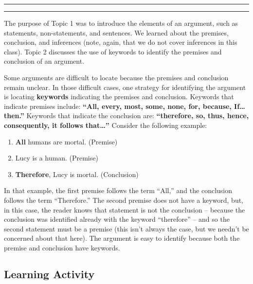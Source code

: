 \documentclass[
]{book}
\providecommand{\tightlist}{%
  \setlength{\itemsep}{0pt}\setlength{\parskip}{0pt}}
\begin{document}
\begin{center}\rule{0.5\linewidth}{0.5pt}\end{center}

\begin{center}\rule{0.5\linewidth}{0.5pt}\end{center}

The purpose of Topic 1 was to introduce the elements of an argument, such as statements, non-statements, and sentences. We learned about the premises, conclusion, and inferences (note, again, that we do not cover inferences in this class). Topic 2 discusses the use of keywords to identify the premises and conclusion of an argument.

Some arguments are difficult to locate because the premises and conclusion remain unclear. In those difficult cases, one strategy for identifying the argument is locating \textbf{keywords} indicating the premises and conclusion. Keywords that indicate premises include: \textbf{``All, every, most, some, none, for, because, If\ldots then.''} Keywords that indicate the conclusion are: \textbf{``therefore, so, thus, hence, consequently, it follows that\ldots{}''} Consider the following example:

\begin{enumerate}
\def\labelenumi{\arabic{enumi}.}
\tightlist
\item
  \textbf{All} humans are mortal. (Premise)
\item
  Lucy is a human. (Premise)
\item
  \textbf{Therefore}, Lucy is mortal. (Conclusion)
\end{enumerate}

In that example, the first premise follows the term ``All,'' and the conclusion follows the term ``Therefore.'' The second premise does not have a keyword, but, in this case, the reader knows that statement is not the conclusion -- because the conclusion was identified already with the keyword ``therefore'' -- and so the second statement must be a premise (this isn't always the case, but we needn't be concerned about that here). The argument is easy to identify because both the premise and conclusion have keywords.

\hypertarget{learning-activity}{%
\subsection*{Learning Activity}\label{learning-activity}}
\end{document}
